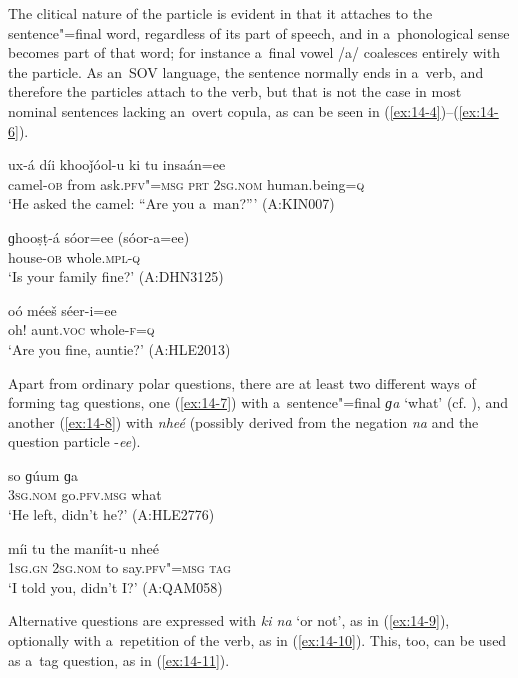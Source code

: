 The clitical nature of the particle is evident in that it attaches to the sentence"=final word, regardless of its part of speech, and in a~phonological sense becomes part of that word; for instance a~final vowel /a/ coalesces entirely with the particle. As an~SOV language, the sentence normally ends in a~verb, and therefore the particles attach to the verb, but that is not the case in most nominal sentences lacking an~overt copula, as can be seen in (\ref{ex:14-4})--(\ref{ex:14-6}).

\begin{exe}
\ex
\label{ex:14-4}
\gll ux-á díi khooǰóol-u ki tu insaán=ee \\
camel-\textsc{ob} from ask.\textsc{pfv"=msg} \textsc{prt} \textsc{2sg.nom} human.being=\textsc{q} \\
\glt `He asked the camel: ``Are you a~man?''' (A:KIN007)

\ex
\label{ex:14-5}
\gll ɡhooṣṭ-á sóor=ee (sóor-a=ee) \\
house-\textsc{ob} whole.\textsc{mpl-q} \\
\glt `Is your family fine?' (A:DHN3125)

\ex
\label{ex:14-6}
\gll oó méeš séer-i=ee \\
oh! aunt.\textsc{voc} whole-\textsc{f=q} \\
\glt `Are you fine, auntie?' (A:HLE2013)
\end{exe}

Apart from ordinary polar questions, there are at least two different ways of forming tag questions, one (\ref{ex:14-7}) with a~sentence"=final \textit{ɡa} `what' (cf. ), and another (\ref{ex:14-8}) with \textit{nheé} (possibly derived from the negation \textit{na} and the question particle -\textit{ee}).

\begin{exe}
\ex
\label{ex:14-7}
\gll so ɡúum ɡa \\
\textsc{3sg.nom} go.\textsc{pfv.msg} what \\
\glt `He left, didn't he?' (A:HLE2776)

\ex
\label{ex:14-8}
\gll míi tu the maníit-u nheé \\
\textsc{1sg.gn} \textsc{2sg.nom} to say.\textsc{pfv"=msg} \textsc{tag} \\
\glt `I told you, didn't I?' (A:QAM058)
\end{exe}

Alternative questions are expressed with \textit{ki na} `or not', as in (\ref{ex:14-9}), optionally with a~repetition of the verb, as in (\ref{ex:14-10}). This, too, can be used as a~tag question, as in (\ref{ex:14-11}).

